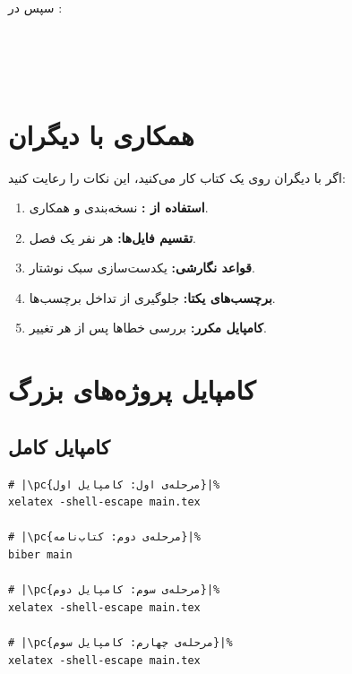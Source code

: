 سپس در :

\begin{latin}
\begin{verbatim}




\end{verbatim}
\end{latin}


\section{همکاری با دیگران}
\label{sec:large-projects-collaboration}

اگر با دیگران روی یک کتاب کار می‌کنید،
این نکات را رعایت کنید:

\begin{enumerate}
    \item \textbf{استفاده از :} نسخه‌بندی
    و همکاری.
    \item \textbf{تقسیم فایل‌ها:} هر نفر یک
    فصل.
    \item \textbf{قواعد نگارشی:} یکدست‌سازی
    سبک نوشتار.
    \item \textbf{برچسب‌های یکتا:} جلوگیری از
    تداخل برچسب‌ها.
    \item \textbf{کامپایل مکرر:} بررسی
    خطاها پس از هر تغییر.
\end{enumerate}


\section{کامپایل پروژه‌های بزرگ}
\label{sec:large-projects-compile}

\subsection{کامپایل کامل}
\label{sec:large-projects-compile-full}

\begin{latin}
\begin{verbatim}
# |\pc{مرحله‌ی اول: کامپایل اول}|%
xelatex -shell-escape main.tex

# |\pc{مرحله‌ی دوم: کتاب‌نامه}|%
biber main

# |\pc{مرحله‌ی سوم: کامپایل دوم}|%
xelatex -shell-escape main.tex

# |\pc{مرحله‌ی چهارم: کامپایل سوم}|%
xelatex -shell-escape main.tex
\end{verbatim}
\end{latin}

